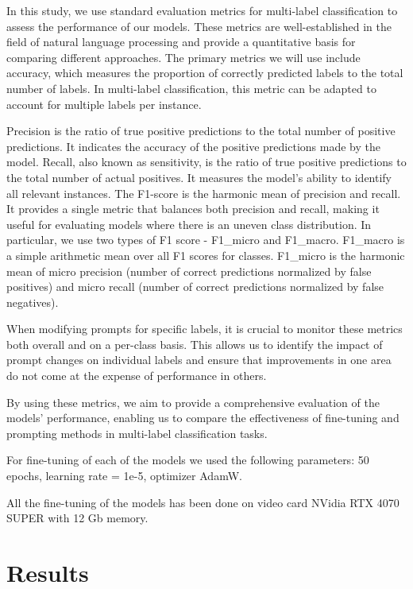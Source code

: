 \documentclass[11pt]{article}
\begin{document}
In this study, we use standard evaluation metrics for multi-label classification to assess the performance of our models. These metrics are well-established in the field of natural language processing and provide a quantitative basis for comparing different approaches. The primary metrics we will use include accuracy, which measures the proportion of correctly predicted labels to the total number of labels. In multi-label classification, this metric can be adapted to account for multiple labels per instance.

Precision is the ratio of true positive predictions to the total number of positive predictions. It indicates the accuracy of the positive predictions made by the model. Recall, also known as sensitivity, is the ratio of true positive predictions to the total number of actual positives. It measures the model’s ability to identify all relevant instances. The F1-score is the harmonic mean of precision and recall. It provides a single metric that balances both precision and recall, making it useful for evaluating models where there is an uneven class distribution. In particular, we use two types of F1 score - F1\_micro and F1\_macro. F1\_macro is a simple arithmetic mean over all F1 scores for classes. F1\_micro is the harmonic mean of micro precision (number of correct predictions normalized by false positives) and micro recall (number of correct predictions normalized by false negatives).

When modifying prompts for specific labels, it is crucial to monitor these metrics both overall and on a per-class basis. This allows us to identify the impact of prompt changes on individual labels and ensure that improvements in one area do not come at the expense of performance in others.

By using these metrics, we aim to provide a comprehensive evaluation of the models’ performance, enabling us to compare the effectiveness of fine-tuning and prompting methods in multi-label classification tasks.

For fine-tuning of each of the models we used the following parameters: 50 epochs, learning rate = 1e-5, optimizer AdamW.

All the fine-tuning of the models has been done on video card NVidia RTX 4070 SUPER with 12 Gb memory.

\section{Results}
\end{document}
